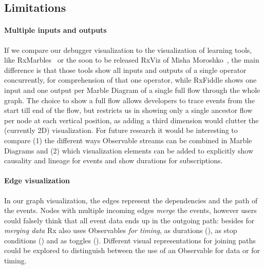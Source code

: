 \subsection{Limitations}

\paragraph{Multiple inputs and outputs} If we compare our debugger
visualization to the visualization of learning tools, like RxMarbles~\cite
{rxmarbles} or the soon to be released RxViz of Misha Moroshko~\cite{rxviz},
the main difference is that those tools show all inputs and outputs of a
single operator concurrently, for comprehension of that one operator,
while RxFiddle shows one input and one output per Marble Diagram of a
single full flow through the whole graph.  The choice to show a full
flow allows developers to trace events from the start till end of the
flow, but restricts us in showing only a single ancestor flow per node
at each vertical position, as adding a third dimension would clutter the
(currently 2D) visualization.  For future research it would be
interesting to compare (1) the different ways Observable streams can be
combined in Marble Diagrams and (2) which visualization elements can be
added to explicitly show causality and lineage for events and show
durations for subscriptions.

\paragraph{Edge visualization} In our graph visualization, the edges
represent the dependencies and the path of the events.  Nodes with
multiple incoming edges \emph{merge} the events, however users could
falsely think that all event data ends up in the outgoing path:  besides
for \textit{merging data} Rx also uses Observables \textit{for timing},
as durations (), as stop conditions () and
as toggles ().  Different visual representations for
joining paths could be explored to distinguish between the use of an
Observable for data or for timing.

